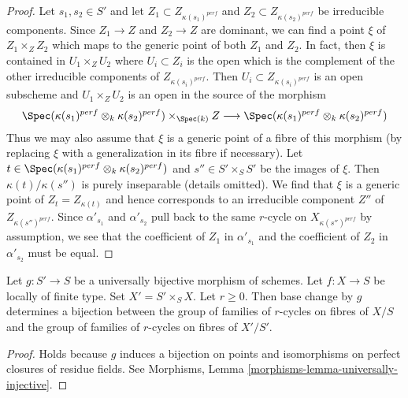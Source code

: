 \begin{proof}
\medskip\noindent
Let $s_1, s_2 \in S'$ and let $Z_1 \subset Z_{\kappa(s_1)^{perf}}$
and $Z_2 \subset Z_{\kappa(s_2)^{perf}}$ be irreducible components.
Since $Z_1 \to Z$ and $Z_2 \to Z$ are dominant, we can find a point
$\xi$ of $Z_1 \times_Z Z_2$ which maps to the generic point of both
$Z_1$ and $Z_2$. In fact, then $\xi$ is contained in $U_1 \times_Z U_2$
where $U_i \subset Z_i$ is the open which is the complement of the
other irreducible components of $Z_{\kappa(s_i)^{perf}}$. Then
$U_i \subset Z_{\kappa(s_i)^{perf}}$ is an open subscheme and
$U_1 \times_Z U_2$ is an open in the source of the morphism
$$
\Spec(\kappa(s_1)^{perf} \otimes_k \kappa(s_2)^{perf})
\times_{\Spec(k)} Z
\longrightarrow
\Spec(\kappa(s_1)^{perf} \otimes_k \kappa(s_2)^{perf})
$$
Thus we may also assume that $\xi$ is a generic point
of a fibre of this morphism (by replacing $\xi$ with a generalization
in its fibre if necessary). Let
$t \in \Spec(\kappa(s_1)^{perf} \otimes_k \kappa(s_2)^{perf})$
and $s'' \in S' \times_S S'$ be the images of $\xi$.
Then $\kappa(t)/\kappa(s'')$ is purely inseparable (details omitted).
We find that $\xi$ is a generic point of $Z_t = Z_{\kappa(t)}$
and hence corresponds to an irreducible component $Z''$
of $Z_{\kappa(s'')^{perf}}$.
Since $\alpha'_{s_1}$ and $\alpha'_{s_2}$ pull back to
the same $r$-cycle on $X_{\kappa(s'')^{perf}}$ by assumption, 
we see that the coefficient of
$Z_1$ in $\alpha'_{s_1}$ and the coefficient of $Z_2$
in $\alpha'_{s_2}$ must be equal.
\end{proof}

\begin{lemma}
\label{lemma-pullback-universally-bijective}
Let $g : S' \to S$ be a universally bijective morphism of schemes.
Let $f : X \to S$ be locally of finite type. Set $X' = S' \times_S X$.
Let $r \geq 0$. Then base change by $g$ determines a bijection
between the group of families of $r$-cycles on fibres of $X/S$ and
the group of families of $r$-cycles on fibres of $X'/S'$.
\end{lemma}

\begin{proof}
Holds because $g$ induces a bijection on points and isomorphisms
on perfect closures of residue fields. See Morphisms, Lemma
\ref{morphisms-lemma-universally-injective}.
\end{proof}

